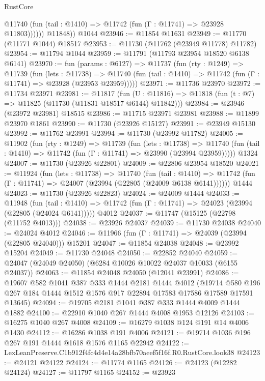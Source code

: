 \begin{lexlean}{RustCore}
\begin{coremodule}
              @11740 (fun (tail : @1410) => @11742 (fun (Γ : @11741) => @23928 @11803))))))
        @11848))
    @1044
@23946 := @11854 @11631
@23949 := @11770 (@11771 @1044) @18517
@23953 := @11730 (@11762 (@23949 @11778) @11782)
@23954 := @11794 @1044
@23959 := @11791 (@11793 @23954 @18520 @6138 @6141)
@23970 := fun (params : @6127) =>
  @11737
    (fun (rty : @1249) =>
    @11739
      (fun (lets : @11738) =>
      @11740 (fun (tail : @1410) => @11742 (fun (Γ : @11741) => @23928 (@23953 @23959)))))
@23971 := @11736 @23970
@23972 := @11734 @23971
@23981 := @11817
    (fun (U : @11816) => @11818 (fun (t : @7) => @11825 (@11730 (@11831 @18517 @6144) @11842)))
@23984 := @23946 (@23972 @23981) @18515
@23986 := @11715 @23971 @23981
@23988 := @11899 @23970 @1861
@23990 := @11730 (@23926 @15127)
@23991 := @23949 @15130
@23992 := @11762 @23991
@23994 := @11730 (@23992 @11782)
@24005 := @11902
    (fun (rty : @1249) =>
    @11739
      (fun (lets : @11738) =>
      @11740 (fun (tail : @1410) => @11742 (fun (Γ : @11741) => @23990 (@23994 @23959)))))
    @1324
@24007 := @11730 (@23926 @22801)
@24009 := @22806 @23954 @18520
@24021 := @11924
    (fun (lets : @11738) =>
    @11740
      (fun (tail : @1410) =>
      @11742 (fun (Γ : @11741) => @24007 (@23994 (@22805 (@24009 @6138 @6141))))))
    @1444
@24023 := @11730 (@23926 @22823)
@24024 := @24009 @1444
@24033 := @11948
    (fun (tail : @1410) => @11742 (fun (Γ : @11741) => @24023 (@23994 (@22805 (@24024 @6141)))))
    @4012
@24037 := @11747 (@15125 (@22798 (@11752 @4013)))
@24038 := @23926 @24037
@24039 := @11730 @24038
@24040 := @24024 @4012
@24046 := @11966 (fun (Γ : @11741) => @24039 (@23994 (@22805 @24040))) @15201
@24047 := @11854 @24038
@24048 := @23992 @15204
@24049 := @11730 @24048
@24050 := @22852 @24040
@24059 := @24047 (@24049 @24050) (@6284 @10026 @10022 @24037 @10033 (@6155 @24037))
@24063 := @11854 @24048 @24050 (@12041 @23991)
@24086 := @19607
    @582
    @1041
    @387
    @333
    @1444
    @2181
    @1444
    @4012
    (@19714 @580 @196 @267 @184 @1444 @1512 @1576 @917 @22894 @17583 @17586 @17589 @17591 @13645)
@24094 := @19705 @2181 @1041 @387 @333 @1444 @4009 @1444 @1882
@24100 := @22910 @1040 @267 @1444 @4008 @1953 @12126
@24103 := @16275 @1040 @267 @4008
@24109 := @16279 @1038 @124 @191 @14 @4006 @1430
@24112 := @16286 @1038 @191 @4006
@24121 := @19714 @1036 @196 @267 @191 @1444 @1618 @1576 @1165 @22942
@24122 := LexLeanPreserve.C1b912f4fc4d4e14a28bfb70aeef5f16f.R0.RustCore.look38
@24123 := @24121 @24122
@24124 := @11774 @1165
@24126 := @24123 (@12282 @24124)
@24127 := @11797 @1165
@24152 := @23923

\end{coremodule}
\end{lexlean}

